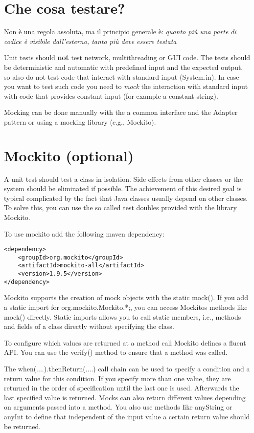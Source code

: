 \documentclass{article}
\begin{document}
\section{Che cosa testare?}
Non \`e una regola assoluta, ma il principio generale \`e: \emph{quanto pi\`u una parte di codice \`e visibile dall'esterno, tanto pi\`u deve essere testata}

Unit tests should \textbf{not} test network, multithreading or GUI code.
The tests should be deterministic and automatic with predefined input
and the expected output, so also do not test code that interact with
standard input (System.in). In case you want to test such code you need to
\emph{mock} the interaction with standard input with code
that provides constant input (for example a constant string). 

Mocking can be done manually with the a common interface and the
Adapter pattern or using a mocking library (e.g., Mockito).

\section{Mockito (optional)}

A unit test should test a class in isolation. Side effects from other
classes or the system should be eliminated if possible. The
achievement of this desired goal is typical complicated by the fact
that Java classes usually depend on other classes. To solve this, you
can use the so called test doubles provided with the library Mockito. 

To use mockito add the following maven dependency:

\begin{lstlisting}
<dependency>
	<groupId>org.mockito</groupId>
	<artifactId>mockito-all</artifactId>
	<version>1.9.5</version>
</dependency>
\end{lstlisting}

Mockito supports the creation of mock objects with the static
mock(). If you add a static import for org.mockito.Mockito.*;, you can
access Mockitos methods like mock() directly. Static imports allows
you to call static members, i.e., methods and fields of a class
directly without specifying the class. 

To configure which values are returned at a method call Mockito
defines a fluent API. You can use the verify() method to ensure that a
method was called. 

The when(....).thenReturn(....) call chain can be used to specify a
condition and a return value for this condition. If you specify more
than one value, they are returned in the order of specification until
the last one is used. Afterwards the last specified value is
returned. Mocks can also return different values depending on
arguments passed into a method. You also use methods like anyString or
anyInt to define that independent of the input value a certain return
value should be returned. 
\end{document}
